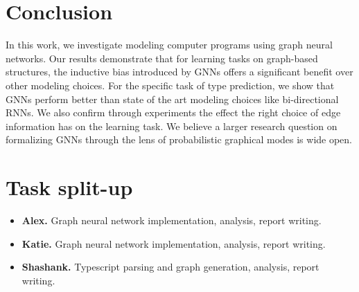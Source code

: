 \section{Conclusion}
\label{sec:conclusions}

In this work, we investigate modeling computer programs using graph neural networks. Our results demonstrate that for learning tasks on graph-based structures, the inductive bias introduced by GNNs offers a significant benefit over other modeling choices. For the specific task of type prediction, we show that GNNs perform better than state of the art modeling choices like bi-directional RNNs. We also confirm through experiments the effect the right choice of edge information has on the learning task. We believe a larger research question on formalizing GNNs through the lens of probabilistic graphical modes is wide open.  

\section{Task split-up}
\begin{itemize}[]
	\item \textbf{Alex.} Graph neural network implementation, analysis, report writing.
	\item \textbf{Katie.} Graph neural network implementation, analysis, report writing.
	\item \textbf{Shashank.} Typescript parsing and graph generation, analysis, report writing.
\end{itemize}

